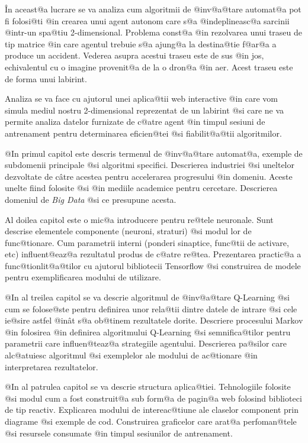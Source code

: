 \^ In aceast@a lucrare se va analiza cum algoritmii de @inv@a@tare automat@a  pot fi folosi@ti @in crearea unui agent autonom care s@a @indeplineasc@a sarcinii @intr-un spa@tiu 2-dimensional. Problema const@a @in rezolvarea unui traseu de tip matrice @in care agentul trebuie s@a ajung@a la destina@tie f@ar@a a produce un accident. Vederea asupra acestui traseu este de sus @in jos, echivalentul cu o imagine provenit@a de la o dron@a @in aer. Acest traseu este de forma unui labirint.  

Analiza se va face cu ajutorul unei aplica@tii web interactive @in care vom simula mediul nostru 2-dimensional reprezentat de un labirint @si care ne va permite analiza datelor furnizate de c@atre agent @in timpul sesiuni de antrenament pentru determinarea eficien@tei @si fiabilit@a@tii algoritmilor.


\hspace{0.2cm}

@In primul capitol este descris termenul de @inv@a@tare automat@a, exemple de subdomenii principale @si algoritmi specifici. Descrierea industriei @si uneltelor dezvoltate de c\^ atre acestea pentru accelerarea progresului @in domeniu. Aceste unelte fiind folosite @si @in mediile academice pentru cercetare. Descrierea domeniul de \textsl{Big Data} @si ce presupune acesta.

Al doilea capitol este o mic@a introducere pentru re@tele neuronale. Sunt descrise elementele componente (neuroni, straturi) @si modul lor de func@tionare. Cum parametrii interni (ponderi sinaptice, func@tii de activare, etc) influent@eaz@a rezultatul produs de c@atre re@tea. Prezentarea practic@a a func@tionlit@a@tilor cu ajutorul bibliotecii Tensorflow @si construirea de modele pentru exemplificarea modului de utilizare.

@In al treilea capitol se va descrie algoritmul de @inv@a@tare Q-Learning @si cum se folose@ste pentru definirea unor rela@tii dintre datele de intrare @si cele ie@sire astfel @in\^ at s@a ob@tinem rezultatele dorite. Descriere procesului Markov @in folosirea @in definirea algoritmului Q-Learning @si semnifica@tilor pentru parametrii care influen@teaz@a strategiile agentului. Descrierea pa@silor care alc@atuiesc algoritmul @si exemplelor ale modului de ac@tionare @in interpretarea rezultatelor.

@In al patrulea capitol se va descrie structura aplica@tiei. Tehnologiile folosite @si modul cum a fost construit@a sub form@a de pagin@a web folosind biblioteci de tip reactiv. Explicarea modului de intereac@tiune ale claselor component prin diagrame @si exemple de cod. Construirea graficelor care arat@a perfoman@tele @si resursele consumate @in timpul sesiunilor de antrenament. 

